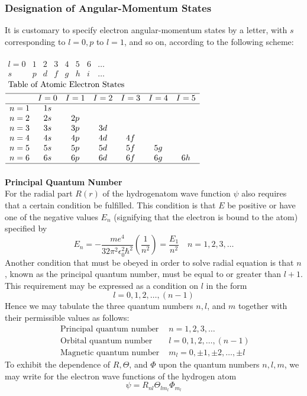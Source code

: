 \subsubsection{Designation of Angular-Momentum States}
It is customary to specify electron angular-momentum states by a letter, with $s$ corresponding to $l=0, p$ to $l=1$, and so on, according to the following scheme:\\\\
$\begin{array}{rlllllll}
	l=0 & 1 & 2 & 3 & 4 & 5 & 6 & \ldots \\
	s & p & d & f & g & h & i & \ldots
\end{array}$\\
$\begin{aligned}
	&\text { Table of Atomic Electron States }\\
	&\begin{array}{lcccccc}
		\hline & I=0 & I=1 & I=2 & I=3 & I=4 & I=5 \\
		\hline n=1 & 1 s & & & & & \\
		n=2 & 2 s & 2 p & & & & \\
		n=3 & 3 s & 3 p & 3 d & & & \\
		n=4 & 4 s & 4 p & 4 d & 4 f & & \\
		n=5 & 5 s & 5 p & 5 d & 5 f & 5 g & \\
		n=6 & 6 s & 6 p & 6 d & 6 f & 6 g & 6 h \\
		\hline
	\end{array}
\end{aligned}$\\\\
\textbf{Principal Quantum Number}\\
 For the radial part $R(r)$ of the hydrogenatom wave function $\psi$ also requires that a certain condition be fulfilled. This condition is that $E$ be positive or have one of the negative values $E_{n}$ (signifying that the electron is bound to the atom) specified by
$$
E_{n}=-\frac{m e^{4}}{32 \pi^{2} \epsilon_{0}^{2} \hbar^{2}}\left(\frac{1}{n^{2}}\right)=\frac{E_{1}}{n^{2}} \quad n=1,2,3, \ldots
$$
Another condition that must be obeyed in order to solve radial equation is that $n$, known as the principal quantum number, must be equal to or greater than $l+1$. This requirement may be expressed as a condition on $l$ in the form
$$
l=0,1,2, \ldots,(n-1)
$$
Hence we may tabulate the three quantum numbers $n, l$, and $m$ together with their permissible values as follows:\\
$$\begin{array}{lc}
	\text { Principal quantum number } & n=1,2,3, \ldots \\
	\text { Orbital quantum number } & l=0,1,2, \ldots,(n-1) \\
	\text { Magnetic quantum number } & m_{l}=0, \pm 1, \pm 2, \ldots, \pm l
\end{array}$$
To exhibit the dependence of $R, \Theta$, and $\Phi$ upon the quantum numbers $n, l, m$, we may write for the electron wave functions of the hydrogen atom
$$
\psi=R_{n l} \Theta_{l m_{l}} \Phi_{m_{l}}
$$
